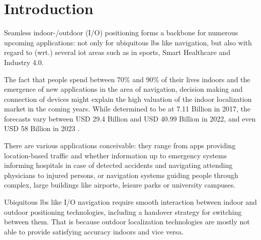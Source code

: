 \chapter{Introduction}

Seamless indoor-/outdoor (I/O) positioning forms a backbone for numerous upcoming applications: not only for ubiquitous \ac{lbs} like navigation, but also with regard to (wrt.) several \ac{iot} areas such as in sports, Smart Healthcare and Industry 4.0.
 
The fact that people spend between 70\% and 90\% of their lives indoors \cite{navIndoors} and the emergence of new applications in the area of navigation, decision making and connection of devices might explain the high valuation of the indoor localization market in the coming years. While determined to be at 7.11 Billion in 2017, the forecasts vary between USD 29.4 Billion \cite{indoorMarket2022} %
and USD 40.99 Billion \cite{indoorMarket22markets} in 2022, and even USD 58 Billion in 2023 \cite{indoorMarket2023}. %

There are various applications conceivable: they range from apps providing location-based traffic and whether information up to emergency systems informing hospitals in case of detected accidents and navigating attending physicians to injured persons, or navigation systems guiding people through complex, large buildings like airports, leisure parks or university campuses.

Ubiquitous \ac{lbs} like I/O navigation require smooth interaction between indoor and outdoor positioning technologies, including a handover strategy for switching between them. That is because outdoor localization technologies are mostly not able to provide satisfying accuracy indoors and vice versa.

